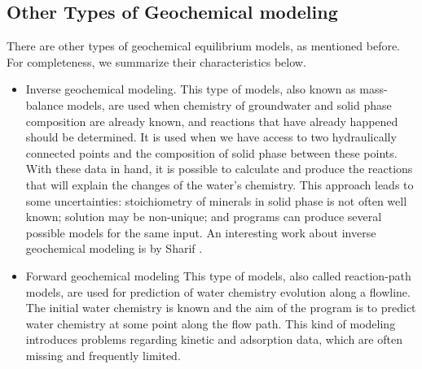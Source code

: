 \subsection{Other Types of Geochemical modeling}
There are other types of geochemical equilibrium models, as mentioned before. For completeness, we summarize their characteristics below. 
\begin{itemize}
\item Inverse geochemical modeling. 
This type of models, also known as mass-balance models, are used when chemistry of groundwater and solid phase composition are already known, and reactions that have already happened should be determined. It is used when we have access to two hydraulically connected points and the composition of solid phase between these points. With these data in hand, it is possible to calculate and produce the reactions that will explain the changes of the water's chemistry. This approach leads to some uncertainties: stoichiometry of minerals in solid phase is not often well known; solution may be non-unique; and programs can produce several possible models for the same input. An interesting work about inverse geochemical modeling is by Sharif \cite{Sharif:07}.

\item Forward geochemical modeling
This type of models, also called reaction-path models, are used for prediction of water chemistry evolution along a flowline. The initial water chemistry is known and the aim of the program is to predict water chemistry at some point along the flow path. This kind of modeling introduces problems regarding kinetic and adsorption data, which are often missing and frequently limited.
\end{itemize}

